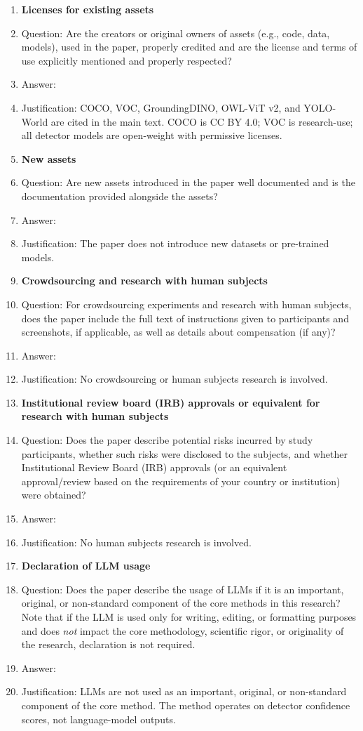 \begin{enumerate}
\item {\bf Licenses for existing assets}
    \item[] Question: Are the creators or original owners of assets (e.g., code, data, models), used in the paper, properly credited and are the license and terms of use explicitly mentioned and properly respected?
    \item[] Answer: \answerYes{}
    \item[] Justification: COCO, VOC, GroundingDINO, OWL-ViT v2, and YOLO-World are cited in the main text. COCO is CC BY 4.0; VOC is research-use; all detector models are open-weight with permissive licenses.

\item {\bf New assets}
    \item[] Question: Are new assets introduced in the paper well documented and is the documentation provided alongside the assets?
    \item[] Answer: \answerNA{}
    \item[] Justification: The paper does not introduce new datasets or pre-trained models.

\item {\bf Crowdsourcing and research with human subjects}
    \item[] Question: For crowdsourcing experiments and research with human subjects, does the paper include the full text of instructions given to participants and screenshots, if applicable, as well as details about compensation (if any)?
    \item[] Answer: \answerNA{}
    \item[] Justification: No crowdsourcing or human subjects research is involved.

\item {\bf Institutional review board (IRB) approvals or equivalent for research with human subjects}
    \item[] Question: Does the paper describe potential risks incurred by study participants, whether such risks were disclosed to the subjects, and whether Institutional Review Board (IRB) approvals (or an equivalent approval/review based on the requirements of your country or institution) were obtained?
    \item[] Answer: \answerNA{}
    \item[] Justification: No human subjects research is involved.

\item {\bf Declaration of LLM usage}
    \item[] Question: Does the paper describe the usage of LLMs if it is an important, original, or non-standard component of the core methods in this research? Note that if the LLM is used only for writing, editing, or formatting purposes and does \emph{not} impact the core methodology, scientific rigor, or originality of the research, declaration is not required.
    \item[] Answer: \answerNA{}
    \item[] Justification: LLMs are not used as an important, original, or non-standard component of the core method. The method operates on detector confidence scores, not language-model outputs.

\end{enumerate}